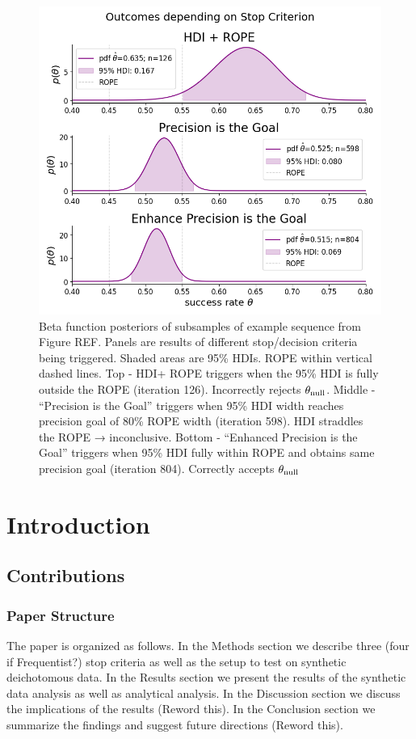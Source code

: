\documentclass{article}
\begin{document}
\begin{figure}[h]
    \centering
    \includegraphics[width=1\textwidth]{cherry_posteriors.png}
    \caption{Beta function posteriors of subsamples of example sequence from Figure REF. Panels are results of different stop/decision criteria being triggered. Shaded areas are 95\% HDIs. ROPE within vertical dashed lines.
    Top - HDI+ ROPE triggers when the 95\% HDI is fully outside the ROPE (iteration 126). Incorrectly rejects $\theta_{\rm null}$. Middle - “Precision is the Goal” triggers when 95\% HDI width reaches precision goal of 80\% ROPE width (iteration 598). HDI straddles the ROPE → inconclusive.
    Bottom - “Enhanced Precision is the Goal” triggers when 95\% HDI fully within ROPE and obtains same precision goal (iteration 804). Correctly accepts $\theta_{\rm null}$}
\end{figure}

\section{Introduction}


\subsection{Contributions}

\subsubsection{Paper Structure}
The paper is organized as follows.
In the Methods section we describe three (four if Frequentist?)
stop criteria as well as the setup to test on synthetic deichotomous data.
In the Results section we present the results of the synthetic data analysis as well as analytical analysis.
In the Discussion section we discuss the implications of the results (Reword this).
In the Conclusion section we summarize the findings and suggest future directions (Reword this).
\end{document}
